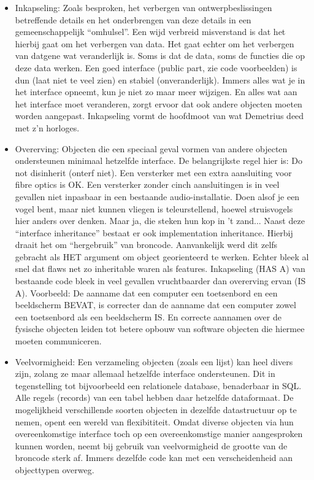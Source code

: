 \documentclass[a4paper,11pt]{article}
\begin{document}
\begin{itemize}

\item Inkapseling: Zoals besproken, het verbergen van ontwerpbeslissingen betreffende details en het onderbrengen van deze details in een gemeenschappelijk ``omhulsel''.
Een wijd verbreid misverstand is dat het hierbij gaat om het verbergen van data.
Het gaat echter om het verbergen van datgene wat veranderlijk is.
Soms is dat de data, soms de functies die op deze data werken.
Een goed interface (public part, zie code voorbeelden) is dun (laat niet te veel zien) en stabiel (onveranderlijk).
Immers alles wat je in het interface opneemt, kun je niet zo maar meer wijzigen.
En alles wat aan het interface moet veranderen, zorgt ervoor dat ook andere objecten moeten worden aangepast.
Inkapseling vormt de hoofdmoot van wat Demetrius deed met z'n horloges.

\item Overerving: Objecten die een speciaal geval vormen van andere objecten ondersteunen minimaal hetzelfde interface.
De belangrijkste regel hier is: Do not disinherit (onterf niet).
Een versterker met een extra aansluiting voor fibre optics is OK.
Een versterker zonder cinch aansluitingen is in veel gevallen niet inpasbaar in een bestaande audio-installatie.
Doen alsof je een vogel bent, maar niet kunnen vliegen is teleurstellend, hoewel struisvogels hier anders over denken.
Maar ja, die steken hun kop in 't zand...
Naast deze ``interface inheritance'' bestaat er ook implementation inheritance.
Hierbij draait het om ``hergebruik'' van broncode.
Aanvankelijk werd dit zelfs gebracht als HET argument om object georienteerd te werken.
Echter bleek al snel dat flaws net zo inheritable waren als features.
Inkapseling (HAS A) van bestaande code bleek in veel gevallen vruchtbaarder dan overerving ervan (IS A).
Voorbeeld: De aanname dat een computer een toetsenbord en een beeldscherm BEVAT, is correcter dan de aanname dat een computer zowel een toetsenbord als een beeldscherm IS.
En correcte aannamen over de fysische objecten leiden tot betere opbouw van software objecten die hiermee moeten communiceren.

\item Veelvormigheid: Een verzameling objecten (zoals een lijst) kan heel divers zijn, zolang ze maar allemaal hetzelfde interface ondersteunen.
Dit in tegenstelling tot bijvoorbeeld een relationele database, benaderbaar in SQL.
Alle regels (records) van een tabel hebben daar hetzelfde dataformaat.
De mogelijkheid verschillende soorten objecten in dezelfde datastructuur op te nemen, opent een wereld van flexibititeit.
Omdat diverse objecten via hun overeenkomstige interface toch op een overeenkomstige manier aangesproken kunnen worden,
neemt bij gebruik van veelvormigheid de grootte van de broncode sterk af.
Immers dezelfde code kan met een verscheidenheid aan objecttypen overweg.

\end{itemize}
\end{document}
